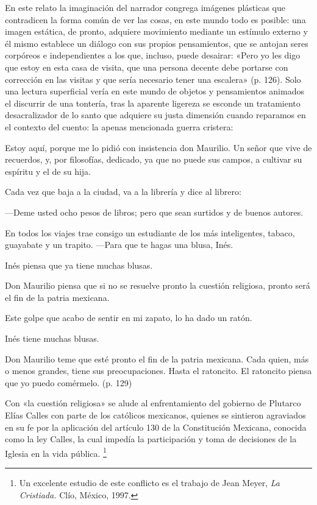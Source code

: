 \documentclass[14pt,twoside,final]{extbook} %
\let\oldfootnote\footnote
\renewcommand\footnote[1]{%
\oldfootnote{\hspace{1mm}#1}}
\begin{document}
En este relato la imaginación del narrador congrega imágenes plásticas que contradicen la forma común de ver las cosas, en este mundo todo es posible: una imagen estática, de pronto, adquiere movimiento mediante un estímulo externo y él mismo establece un diálogo con sus propios pensamientos, que se antojan seres corpóreos e independientes a los que, incluso, puede desairar: «Pero yo les digo que estoy en esta casa de visita, que una persona decente debe portarse con corrección en las visitas y que sería necesario tener una escalera» (p. 126). Solo una lectura superficial vería en este mundo de objetos y pensamientos animados el discurrir de una tontería, tras la aparente ligereza se esconde un tratamiento desacralizador de lo santo que adquiere su justa dimensión cuando reparamos en el contexto del cuento: la apenas mencionada guerra cristera:
\begin{quoting}
Estoy aquí, porque me lo pidió con insistencia don Maurilio. Un señor que vive de recuerdos, y, por filosofías, dedicado, ya que no puede sus campos, a cultivar su espíritu y el de su hija.

Cada vez que baja a la ciudad, va a la librería y dice al librero:

---Deme usted ocho pesos de libros; pero que sean surtidos y de buenos autores.

En todos los viajes trae consigo un estudiante de los más inteligentes, tabaco, guayabate y un trapito. ---Para que te hagas una blusa, Inés.

Inés piensa que ya tiene muchas blusas.

Don Maurilio piensa que si no se resuelve pronto la cuestión religiosa, pronto será el fin de la patria mexicana.

Este golpe que acabo de sentir en mi zapato, lo ha dado un ratón.

Inés tiene muchas blusas.

Don Maurilio teme que esté pronto el fin de la patria mexicana. Cada quien, más o menos grandes, tiene sus preocupaciones. Hasta el ratoncito. El ratoncito piensa que yo puedo comérmelo. (p. 129)
\end{quoting}
Con «la cuestión religiosa» se alude al enfrentamiento del gobierno de Plutarco Elías Calles con parte de los católicos mexicanos, quienes se sintieron agraviados en su fe por la aplicación del artículo 130 de la Constitución Mexicana, conocida como la ley Calles, la cual impedía la participación y toma de decisiones de la Iglesia en la vida pública.\footnote{Un excelente estudio de este conflicto es el trabajo de Jean Meyer, \emph{La Cristiada.} Clío, México, 1997.}
\end{document}
